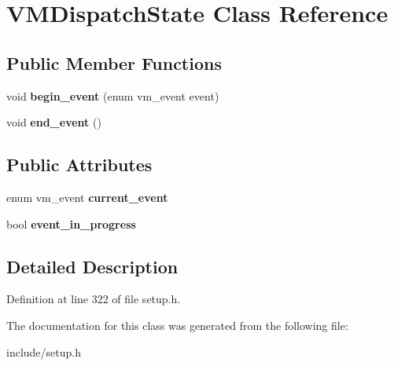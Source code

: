 \hypertarget{classVMDispatchState}{\section{V\-M\-Dispatch\-State Class Reference}
\label{classVMDispatchState}
}
\subsection*{Public Member Functions}
\begin{DoxyCompactItemize}
\item 
\hypertarget{classVMDispatchState_a3a0362f365280487cf9d34390ed0b2dc}{void {\bfseries begin\-\_\-event} (enum vm\-\_\-event event)}\label{classVMDispatchState_a3a0362f365280487cf9d34390ed0b2dc}

\item 
\hypertarget{classVMDispatchState_ac8a6709d68dbc4bf1a460292d52beab0}{void {\bfseries end\-\_\-event} ()}\label{classVMDispatchState_ac8a6709d68dbc4bf1a460292d52beab0}

\end{DoxyCompactItemize}
\subsection*{Public Attributes}
\begin{DoxyCompactItemize}
\item 
\hypertarget{classVMDispatchState_a0a92ac377b1d3e68d8dd3af2c8c433ba}{enum vm\-\_\-event {\bfseries current\-\_\-event}}\label{classVMDispatchState_a0a92ac377b1d3e68d8dd3af2c8c433ba}

\item 
\hypertarget{classVMDispatchState_a46c3a4522f352e7da32a6553fd27a471}{bool {\bfseries event\-\_\-in\-\_\-progress}}\label{classVMDispatchState_a46c3a4522f352e7da32a6553fd27a471}

\end{DoxyCompactItemize}


\subsection{Detailed Description}


Definition at line 322 of file setup.\-h.



The documentation for this class was generated from the following file\-:\begin{DoxyCompactItemize}
\item 
include/setup.\-h\end{DoxyCompactItemize}
